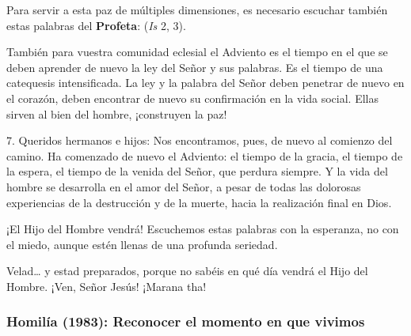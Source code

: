 \begin{body}
	Para servir a esta paz de múltiples dimensiones, es necesario escuchar también estas palabras del \textbf{Profeta}:  (\emph{Is} 2, 3). 
	
	También para vuestra comunidad eclesial el Adviento es el tiempo en el que se deben aprender de nuevo la ley del Señor y sus palabras. Es el tiempo de una catequesis intensificada. La ley y la palabra del Señor deben penetrar de nuevo en el corazón, deben encontrar de nuevo su confirmación en la vida social. Ellas sirven al bien del hombre, ¡construyen la paz! 
	
	7. Queridos hermanos e hijos: Nos encontramos, pues, de nuevo al comienzo del camino. Ha comenzado de nuevo el Adviento: el tiempo de la gracia, el tiempo de la espera, el tiempo de la venida del Señor, que perdura siempre. Y la vida del hombre se desarrolla en el amor del Señor, a pesar de todas las dolorosas experiencias de la destrucción y de la muerte, hacia la realización final en Dios. 
	
	¡El Hijo del Hombre vendrá! Escuchemos estas palabras con la esperanza, no con el miedo, aunque estén llenas de una profunda seriedad. 
	
	Velad\ldots{} y estad preparados, porque no sabéis en qué día vendrá el Hijo del Hombre. ¡Ven, Señor Jesús! ¡Marana tha!
\end{body}

\newpage
\subsubsection{Homilía (1983): Reconocer el momento en que vivimos}


